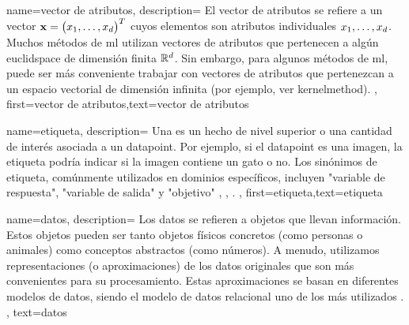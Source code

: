 {
	name={vector de atributos},
	description={
		El vector de atributos se refiere a un vector 
		${\bf x} = \big(x_{1},\ldots,x_{d}\big)^{T}$ cuyos elementos son atributos individuales 
		$x_{1},\ldots,x_{d}$. 
		Muchos métodos de \gls{ml} utilizan vectores de atributos que pertenecen a algún 
		\gls{euclidspace} de dimensión finita $\mathbb{R}^{d}$. Sin embargo, para algunos 
		métodos de \gls{ml}, puede ser más conveniente trabajar con vectores de atributos que pertenezcan 
		a un espacio vectorial de dimensión infinita (por ejemplo, ver \gls{kernelmethod}). 
	},
	first={vector de atributos},text={vector de atributos}  
}

{
	name={etiqueta},
	description={
		Una es un hecho de nivel superior o una cantidad de interés asociada a un \gls{datapoint}. 
		Por ejemplo, si el \gls{datapoint} es una imagen, la etiqueta podría indicar si la 
		imagen contiene un gato o no. Los sinónimos de etiqueta, comúnmente utilizados en dominios específicos, 
		incluyen "variable de respuesta", "variable de salida" y "objetivo" \cite{Gujarati2021}, \cite{Dodge2003}, \cite{Everitt2022}.
	},
	first={etiqueta},text={etiqueta}  
}

{
	name={datos},
	description={
		Los datos se refieren a objetos que llevan información. 
		Estos objetos pueden ser tanto objetos físicos concretos (como personas o animales) 
		como conceptos abstractos (como números). 
		A menudo, utilizamos representaciones (o aproximaciones) de los datos originales que son 
		más convenientes para su procesamiento. Estas aproximaciones se basan en diferentes 
		modelos de datos, siendo el modelo de datos relacional uno de los más utilizados \cite{codd1970relational}.
	}, 
	text={datos}
}


